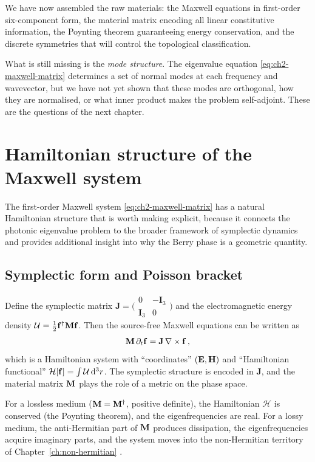 We have now assembled the raw materials: the Maxwell equations in
first-order six-component form, the material matrix encoding all linear
constitutive information, the Poynting theorem guaranteeing energy
conservation, and the discrete symmetries that will control the
topological classification.

What is still missing is the \emph{mode structure}.  The eigenvalue
equation \eqref{eq:ch2-maxwell-matrix} determines a set of normal modes
at each frequency and wavevector, but we have not yet shown that these
modes are orthogonal, how they are normalised, or what inner product
makes the problem self-adjoint.  These are the questions of the next
chapter.

\section{Hamiltonian structure of the Maxwell system}
\label{sec:ch2-hamiltonian}

The first-order Maxwell system \eqref{eq:ch2-maxwell-matrix} has a
natural Hamiltonian structure that is worth making explicit, because
it connects the photonic eigenvalue problem to the broader framework
of symplectic dynamics and provides additional insight into why the
Berry phase is a geometric quantity.

\subsection{Symplectic form and Poisson bracket}
\label{sec:ch2-symplectic}

Define the symplectic matrix
$\mathbf{J}=\bigl(\begin{smallmatrix}0&-\mathbf{I}_3\\
\mathbf{I}_3&0\end{smallmatrix}\bigr)$ and the electromagnetic
energy density $\mathcal{U}=\frac{1}{2}\mathbf{f}^\dagger\mathbf{M}\mathbf{f}$.
Then the source-free Maxwell equations can be written as
\begin{equation}\label{eq:ch2-symplectic-form}
  \mathbf{M}\,\partial_t\mathbf{f}
  = \mathbf{J}\,\nabla\times\mathbf{f}\,,
\end{equation}
which is a Hamiltonian system with ``coordinates''
$(\mathbf{E},\mathbf{H})$ and ``Hamiltonian functional''
$\mathcal{H}[\mathbf{f}]=\int\mathcal{U}\,\mathrm{d}^3 r$.  The symplectic
structure is encoded in $\mathbf{J}$, and the material matrix $\mathbf{M}$
plays the role of a metric on the phase space.

For a lossless medium ($\mathbf{M}=\mathbf{M}^\dagger$, positive definite),
the Hamiltonian $\mathcal{H}$ is conserved (the Poynting theorem),
and the eigenfrequencies are real.  For a lossy medium, the
anti-Hermitian part of $\mathbf{M}$ produces dissipation, the
eigenfrequencies acquire imaginary parts, and the system moves into the
non-Hermitian territory of Chapter~\ref{ch:non-hermitian}
\cite{ozawa2018topological}.

